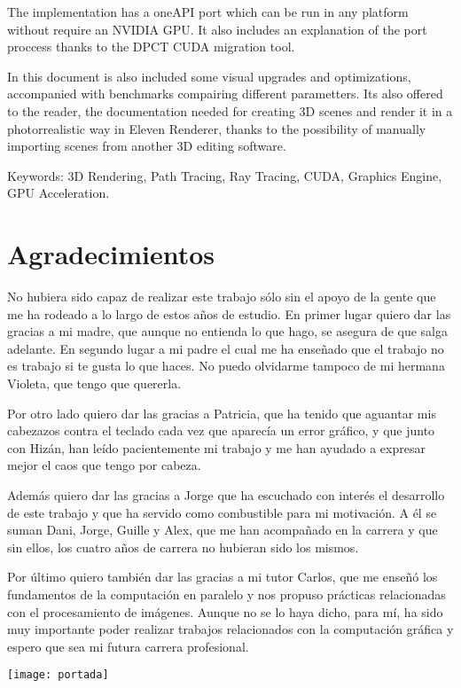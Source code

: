 The implementation has a oneAPI port which can be run in any platform without require an NVIDIA GPU. It also includes an explanation of the port proccess thanks to the DPCT CUDA migration tool.

In this document is also included some visual upgrades and optimizations, accompanied with benchmarks compairing different parametters. Its also offered to the reader, the documentation needed for creating 3D scenes and render it in a photorrealistic way in Eleven Renderer, thanks to the possibility of manually importing scenes from another 3D editing software.


Keywords: 3D Rendering, Path Tracing, Ray Tracing, CUDA, Graphics Engine, GPU Acceleration.


\chapter*{Agradecimientos}

No hubiera sido capaz de realizar este trabajo sólo sin el apoyo de la gente que me ha rodeado a lo largo de estos años de estudio. En primer lugar quiero dar las gracias a mi madre, que aunque no entienda lo que hago, se asegura de que salga adelante. En segundo lugar a mi padre el cual me ha enseñado que el trabajo no es trabajo si te gusta lo que haces. No puedo olvidarme tampoco de mi hermana Violeta, que tengo que quererla.

Por otro lado quiero dar las gracias a Patricia, que ha tenido que aguantar mis cabezazos contra el teclado cada vez que aparecía un error gráfico, y que junto con Hizán, han leído pacientemente mi trabajo y me han ayudado a expresar mejor el caos que tengo por cabeza.

Además quiero dar las gracias a Jorge que ha escuchado con interés el desarrollo de este trabajo y que ha servido como combustible para mi motivación. A él se suman Dani, Jorge, Guille y Alex, que me han acompañado en la carrera y que sin ellos, los cuatro años de carrera no hubieran sido los mismos.

Por último quiero también dar las gracias a mi tutor Carlos, que me enseñó los fundamentos de la computación en paralelo y nos propuso prácticas relacionadas con el procesamiento de imágenes. Aunque no se lo haya dicho, para mí, ha sido muy importante poder realizar trabajos relacionados con la computación gráfica y espero que sea mi futura carrera profesional.


\newpage

\texttt{[image: portada]}

\scalebox{5}{\color{white}{Eleven Renderer}}

